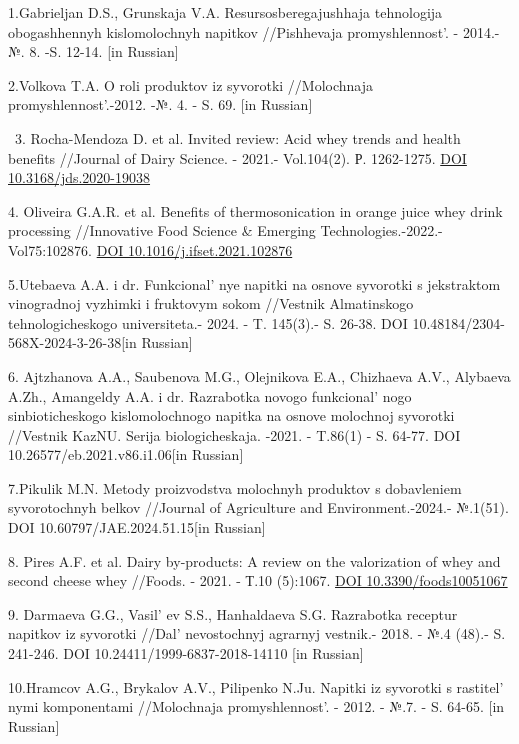 \begin{references}
1.Gabrieljan D.S., Grunskaja V.A. Resursosberegajushhaja tehnologija
obogashhennyh kislomolochnyh napitkov //Pishhevaja
promyshlennost'. - 2014.- №. 8. -S. 12-14. {[}in
Russian{]}

2.Volkova T.A. O roli produktov iz syvorotki //Molochnaja
promyshlennost'.-2012. -№. 4. - S. 69. {[}in Russian{]}

~3. Rocha-Mendoza D. et al. Invited review: Acid whey trends and health
benefits //Journal of Dairy Science. - 2021.- Vol.104(2). Р. 1262-1275.
\href{https://doi.org/10.3168/jds.2020-19038}{DOI
10.3168/jds.2020-19038}

4. Oliveira G.A.R. et al. Benefits of thermosonication in orange juice
whey drink processing //Innovative Food Science \& Emerging
Technologies.-2022.- Vol75:102876.
\href{https://doi.org/10.1016/j.ifset.2021.102876}{DOI
10.1016/j.ifset.2021.102876}

5.Utebaeva A.A. i dr. Funkcional' nye napitki na osnove
syvorotki s jekstraktom vinogradnoj vyzhimki i fruktovym sokom //Vestnik
Almatinskogo tehnologicheskogo universiteta.- 2024. - T. 145(3).- S.
26-38. DOI 10.48184/2304-568X-2024-3-26-38{[}in Russian{]}

6. Ajtzhanova A.A., Saubenova M.G., Olejnikova E.A., Chizhaeva A.V.,
Alybaeva A.Zh., Amangeldy A.A. i dr. Razrabotka novogo
funkcional' nogo sinbioticheskogo kislomolochnogo napitka
na osnove molochnoj syvorotki //Vestnik KazNU. Serija biologicheskaja.
-2021. - T.86(1) - S. 64-77. DOI \\10.26577/eb.2021.v86.i1.06{[}in
Russian{]}

7.Pikulik M.N. Metody proizvodstva molochnyh produktov s dobavleniem
syvorotochnyh belkov //Journal of Agriculture and Environment.-2024.-
№.1(51).
DOI 10.60797/JAE.2024.51.15{[}in Russian{]}

8. Pires A.F. et al. Dairy by-products: A review on the valorization of
whey and second cheese whey //Foods. - 2021. - Т.10 (5):1067.
\href{https://doi.org/10.3390/foods10051067}{DOI 10.3390/foods10051067}

9. Darmaeva G.G., Vasil' ev S.S., Hanhaldaeva S.G.
Razrabotka receptur napitkov iz syvorotki
//Dal' nevostochnyj agrarnyj vestnik.- 2018. - №.4 (48).-
S. 241-246.
DOI 10.24411/1999-6837-2018-14110 {[}in Russian{]}

10.Hramcov A.G., Brykalov A.V., Pilipenko N.Ju. Napitki iz syvorotki s
rastitel' nymi komponentami //Molochnaja
promyshlennost'. - 2012. - №.7. - S. 64-65. {[}in
Russian{]}


\end{references}
